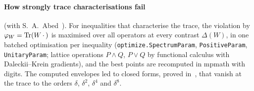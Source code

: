 \paragraph{How strongly trace characterisations fail}\label{sec:tc} (with S.~A.~Abed~\cite{nn_trace}). For
 inequalities that characterise the trace, the violation
by $\varphi_W=\operatorname{Tr}(W\,\cdot\,)$ is maximised over all operators at every contrast $\Delta(W)$, in one batched optimisation per
inequality (\texttt{optimize.SpectrumParam}, \texttt{PositiveParam}, \texttt{UnitaryParam}; lattice operations
$P\wedge Q$, $P\vee Q$ by functional calculus with Daleckii--Krein gradients), and the best points are recomputed in mpmath
with  digits. The computed envelopes led to closed forms,
proved in~\cite{nn_trace}, that vanish at the trace to the orders $\delta$, $\delta^2$, $\delta^4$ and $\delta^8$.
